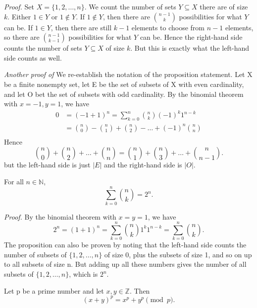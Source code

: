 \documentclass{tufte-handout}
\begin{document}
\textit{Proof.} Set \( X = \{1,2,\ldots,n\} \). We count the number of sets \( Y \subseteq X  \) there 
are of size \( k  \). Either \( 1 \in Y  \) or \( 1 \notin Y  \). If \( 1 \notin Y  \),
then there are \( \binom{n-1}{k} \) possibilities for what \( Y \) can be. If \( 1 \in Y  \),
then there are still \( k-1 \) elements to choose from \( n-1 \) elements, so there are \( \binom{n-1}{k-1} \) possibilities for what \( Y \) can be. 
Hence the right-hand side counts the number of sets \( Y \subseteq X \) of size \( k \). But
this is exactly what the left-hand side counts as well. \hfill \qedsymbol

\textit{Another proof of } We re-establish the notation of the
proposition statement. Let X be a finite nonempty set, let E be the set of subsets of X with even cardinality, and let O
bet the set of subsets with odd cardinality. By the binomial theorem with \( x = -1, y = 1 \), we have
\begin{align*}
0 &= (-1+1)^n =  \sum_{k=0}^{n}\binom{n}{k}(-1)^k1^{n-k}\\
    &= \binom{n}{0} - \binom{n}{1} + \binom{n}{2} - \ldots + (-1)^n\binom{n}{n}\\
\end{align*}
Hence 
\[\binom{n}{0} + \binom{n}{2} + \ldots + \binom{n}{n} = \binom{n}{1} + \binom{n}{3} + \ldots + \binom{n}{n-1}.\]
but the left-hand side is just \( \left|E\right| \) and the right-hand side is \( \left|O\right| \). \hfill \qedsymbol

\begin{Proposition}
    For all \( n \in \mathbb{N} \),
    \[\sum_{k=0}^{n}\binom{n}{k} = 2^n.\]
\end{Proposition}

\textit{Proof.} By the binomial theorem with \( x = y = 1 \), we have
\[2^n = (1+1)^n = \sum_{k=0}^{n}\binom{n}{k}1^k 1^{n-k}= \sum_{k=0}^{n}\binom{n}{k}.\]
The proposition can also be proven by noting that the left-hand side counts the number of subsets of
\( \{1,2,\ldots,n \} \) of size 0, plus the subsets of size 1, and so on up to all subsets of size n.
But adding up all these numbers gives the number of all subsets of \( \{1,2,\ldots,n \} \), which is \( 2^n \). \hfill \qedsymbol 

\begin{Theorem}
    Let p be a prime number and let \( x,y \in \mathbb{Z}\).
    Then 
    \[(x+y)^p=x^p + y^p \pmod{p}.\]
\end{Theorem}
\end{document}

